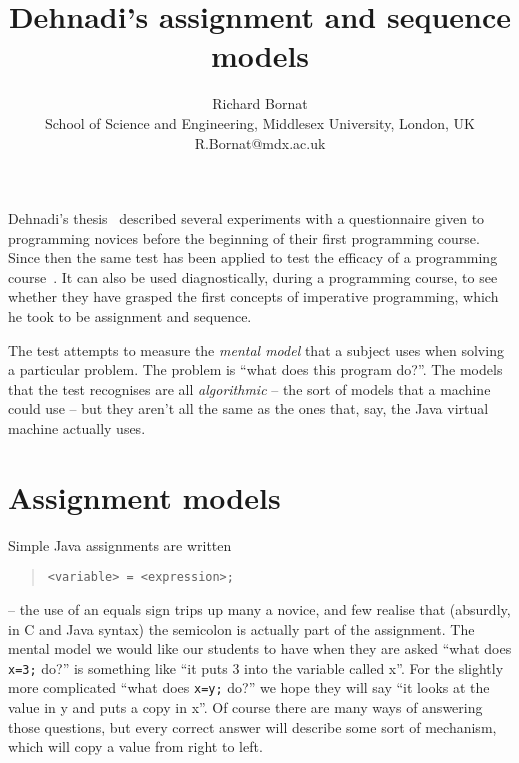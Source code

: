 \documentclass[11pt,a4paper]{article}
\title{Dehnadi's assignment and sequence models}
\author{Richard Bornat %
\\ School of Science and Engineering, Middlesex University, London, UK \\ %
R.Bornat@mdx.ac.uk}
\begin{document}
\maketitle

%

Dehnadi's thesis~\citep{DehnadiThesis2009} described several experiments with a questionnaire given to programming novices before the beginning of their first programming course. Since then the same test has been applied to test the efficacy of a programming course~\citep{FordVenemaAssessingtheSuccessofanIntroductoryProgrammingCourse2010}. It can also be used diagnostically, during a programming course, to see whether they have grasped the first concepts of imperative programming, which he took to be assignment and sequence.

The test attempts to measure the \emph{mental model} that a subject uses when solving a particular problem. The problem is ``what does this program do?''. The models that the test recognises are all \emph{algorithmic} -- the sort of models that a machine could use -- but they aren't all the same as the ones that, say, the Java virtual machine actually uses.

\section{Assignment models}

Simple Java assignments are written \begin{quote}
\lstinline{<variable> = <expression>;}
\end{quote}
-- the use of an equals sign trips up many a novice, and few realise that (absurdly, in C and Java syntax) the semicolon is actually part of the assignment. The mental model we would like our students to have when they are asked ``what does \lstinline{x=3;} do?'' is something like ``it puts 3 into the variable called x''. For the slightly more complicated ``what does \lstinline{x=y;} do?'' we hope they will say ``it looks at the value in y and puts a copy in x''. Of course there are many ways of answering those questions, but every correct answer will describe some sort of mechanism, which will copy a value from right to left. 
\end{document}
